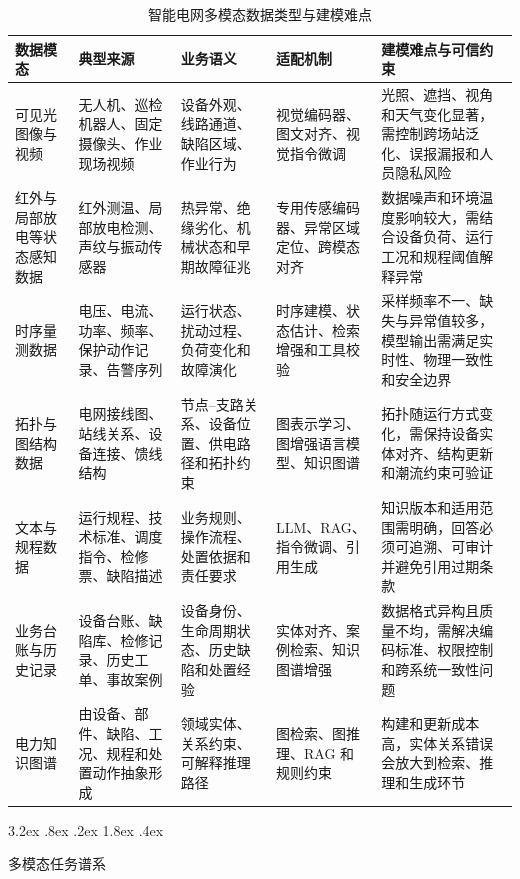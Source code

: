 \documentclass[10.5pt,compsoc]{CjC}
\makeatletter
\renewcommand\subsection{\@startsection{subsection}{2}{\z@}%
  {3.2ex \@plus .8ex \@minus .2ex}%
  {1.8ex \@plus .4ex}%
  {\normalfont\zihao{5}\heiti\bfseries\raggedright}}
\theoremstyle{mystyle}
\makeatother
\begin{document}
\begin{table}[t]
\centering
\caption{智能电网多模态数据类型与建模难点}
\label{tab:data_modality}
\songti
\setlength{\tabcolsep}{3pt}
\renewcommand{\arraystretch}{1.16}
\begin{tabularx}{\textwidth}{p{} p{} p{} p{} X}
\toprule
数据模态 & 典型来源 & 业务语义 & 适配机制 & 建模难点与可信约束 \\
\midrule
可见光图像与视频 & 无人机、巡检机器人、固定摄像头、作业现场视频 & 设备外观、线路通道、缺陷区域、作业行为 & 视觉编码器、图文对齐、视觉指令微调 & 光照、遮挡、视角和天气变化显著，需控制跨场站泛化、误报漏报和人员隐私风险 \\
红外与局部放电等状态感知数据 & 红外测温、局部放电检测、声纹与振动传感器 & 热异常、绝缘劣化、机械状态和早期故障征兆 & 专用传感编码器、异常区域定位、跨模态对齐 & 数据噪声和环境温度影响较大，需结合设备负荷、运行工况和规程阈值解释异常 \\
时序量测数据 & 电压、电流、功率、频率、保护动作记录、告警序列 & 运行状态、扰动过程、负荷变化和故障演化 & 时序建模、状态估计、检索增强和工具校验 & 采样频率不一、缺失与异常值较多，模型输出需满足实时性、物理一致性和安全边界 \\
拓扑与图结构数据 & 电网接线图、站线关系、设备连接、馈线结构 & 节点--支路关系、设备位置、供电路径和拓扑约束 & 图表示学习、图增强语言模型、知识图谱 & 拓扑随运行方式变化，需保持设备实体对齐、结构更新和潮流约束可验证 \\
文本与规程数据 & 运行规程、技术标准、调度指令、检修票、缺陷描述 & 业务规则、操作流程、处置依据和责任要求 & LLM、RAG、指令微调、引用生成 & 知识版本和适用范围需明确，回答必须可追溯、可审计并避免引用过期条款 \\
业务台账与历史记录 & 设备台账、缺陷库、检修记录、历史工单、事故案例 & 设备身份、生命周期状态、历史缺陷和处置经验 & 实体对齐、案例检索、知识图谱增强 & 数据格式异构且质量不均，需解决编码标准、权限控制和跨系统一致性问题 \\
电力知识图谱 & 由设备、部件、缺陷、工况、规程和处置动作抽象形成 & 领域实体、关系约束、可解释推理路径 & 图检索、图推理、RAG 和规则约束 & 构建和更新成本高，实体关系错误会放大到检索、推理和生成环节 \\
\bottomrule
\end{tabularx}
\end{table}


\subsection{多模态任务谱系}
\end{document}
